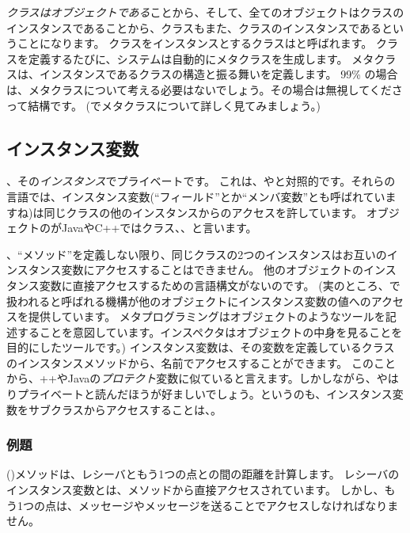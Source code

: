 \documentclass[a4paper,10pt,twoside]{book}
\begin{document}
\emph{クラスはオブジェクトである}ことから、そして、{全てのオブジェクトはクラスのインスタンスである}ことから、クラスもまた、クラスのインスタンスであるということになります。
クラスをインスタンスとするクラスはと呼ばれます。
クラスを定義するたびに、システムは自動的にメタクラスを生成します。
メタクラスは、インスタンスであるクラスの構造と振る舞いを定義します。
99\% の場合は、メタクラスについて考える必要はないでしょう。その場合は無視してくださって結構です。
(でメタクラスについて詳しく見てみましょう。)
\subsection{インスタンス変数}

、その\emph{インスタンス}でプライベートです。
これは、やと対照的です。それらの言語では、インスタンス変数(``フィールド''とか``メンバ変数''とも呼ばれていますね)は同じクラスの他のインスタンスからのアクセスを許しています。
オブジェクトのがJavaやC++ではクラス、、と言います。


、``メソッド''を定義しない限り、同じクラスの2つのインスタンスはお互いのインスタンス変数にアクセスすることはできません。
他のオブジェクトのインスタンス変数に直接アクセスするための言語構文がないのです。
(実のところ、で扱われると呼ばれる機構が他のオブジェクトにインスタンス変数の値へのアクセスを提供しています。
メタプログラミングはオブジェクトのようなツールを記述することを意図しています。インスペクタはオブジェクトの中身を見ることを目的にしたツールです。)
インスタンス変数は、その変数を定義しているクラスのインスタンスメソッドから、名前でアクセスすることができます。
このことから、++やJavaの\emph{プロテクト}変数に似ていると言えます。しかしながら、やはりプライベートと読んだほうが好ましいでしょう。というのも、インスタンス変数をサブクラスからアクセスすることは、。

\subsubsection{例題}
 ()メソッドは、レシーバともう1つの点との間の距離を計算します。
レシーバのインスタンス変数とは、メソッドから直接アクセスされています。
しかし、もう1つの点は、メッセージやメッセージを送ることでアクセスしなければなりません。
\end{document}
